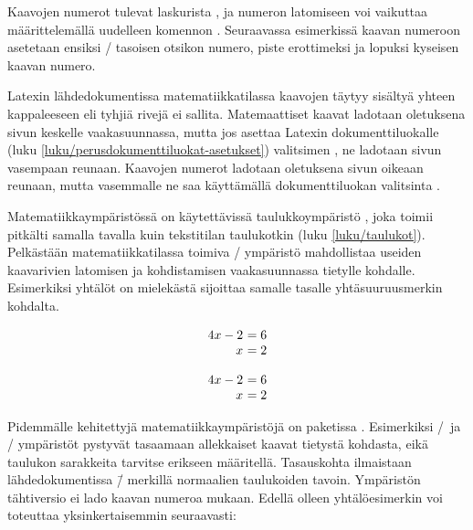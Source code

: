 Kaavojen numerot tulevat laskurista , ja numeron
latomiseen voi vaikuttaa määrittelemällä uudelleen komennon
. Seuraavassa esimerkissä kaavan numeroon asetetaan
ensiksi \-/ tasoisen otsikon numero, piste erottimeksi
ja lopuksi kyseisen kaavan numero.

\begin{koodilohkosis}
\renewcommand{\theequation}{\thesection.\arabic{equation}}
\end{koodilohkosis}

\noindent
Latexin lähdedokumentissa matematiikkatilassa kaavojen täytyy sisältyä
yhteen kappaleeseen eli tyhjiä rivejä ei sallita. Matemaattiset kaavat
ladotaan oletuksena sivun keskelle vaakasuunnassa, mutta jos asettaa
Latexin dokumenttiluokalle (luku
\ref{luku/perusdokumenttiluokat-asetukset}) valitsimen , ne
ladotaan sivun vasempaan reunaan. Kaavojen numerot ladotaan oletuksena
sivun oikeaan reunaan, mutta vasemmalle ne saa käyttämällä
dokumenttiluokan valitsinta .

Matematiikkaympäristössä on käytettävissä taulukkoympäristö
, joka toimii pitkälti samalla tavalla kuin
tekstitilan taulukotkin (luku \ref{luku/taulukot}). Pelkästään
matematiikkatilassa toimiva \-/ ympäristö mahdollistaa
useiden kaavarivien latomisen ja kohdistamisen vaakasuunnassa tietylle
kohdalle. Esimerkiksi yhtälöt on mielekästä sijoittaa samalle tasalle
yhtäsuuruusmerkin kohdalta.

\begin{koodilohkosis}
\[ \begin{array}{r@{~}l}
     4x - 2 &= 6 \\
     x      &= 2 \\
   \end{array} \]
\end{koodilohkosis}
\[ \begin{array}{r@{~}l}
     4x - 2 &= 6 \\
     x      &= 2 \\
   \end{array} \]

\noindent
Pidemmälle kehitettyjä matematiikkaympäristöjä on paketissa
. Esimerkiksi \-/\ ja
\-/ ympäristöt pystyvät tasaamaan allekkaiset kaavat
tietystä kohdasta, eikä taulukon sarakkeita tarvitse erikseen
määritellä. Tasauskohta ilmaistaan lähdedokumentissa \koodi{\&}\=/
merkillä normaalien taulukoiden tavoin. Ympäristön tähtiversio
 ei lado kaavan numeroa mukaan. Edellä olleen
yhtälöesimerkin voi toteuttaa yksinkertaisemmin seuraavasti:

